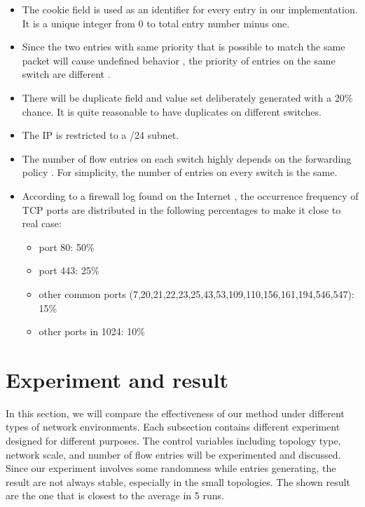 \begin{itemize}
\item 
The cookie field is used as an identifier for every entry in our implementation. It is a unique integer from 0 to total entry number minus one.\sout{}
\item
Since the two entries with same priority that is possible to match the same packet will cause undefined behavior \cite{OF_SPEC}, the priority of entries on the same switch are different .
\item
There will be duplicate field and value set deliberately generated with a 20\% chance. It is quite reasonable to have duplicates on different switches. 
\item
The IP is restricted to a /24 subnet.
\item
The number of flow entries on each switch highly depends on the forwarding policy \cite{MPFHMRSV09}. For simplicity, the number of entries on every switch is the same. 
\item
According to a firewall log found on the Internet \cite{PORT_FREQ}, the occurrence frequency of TCP ports are distributed in the following percentages to make it close to real case:
\begin{itemize}
\item
port 80: 50\%
\item
port 443: 25\%
\item
other common ports (7,20,21,22,23,25,43,53,109,110,156,161,194,546,547): 15\%
\item
other ports in 1024: 10\%
\end{itemize}
\end{itemize}

\section{Experiment and result}
In this section, we will compare the effectiveness of our method under different types of network environments. Each subsection contains different experiment designed for different purposes. The control variables including topology type, network scale, and number of flow entries will be experimented and discussed. Since our experiment involves some randomness while entries generating, the result are not always stable, especially in the small topologies. The shown result are the one that is closest to the average in 5 runs.

